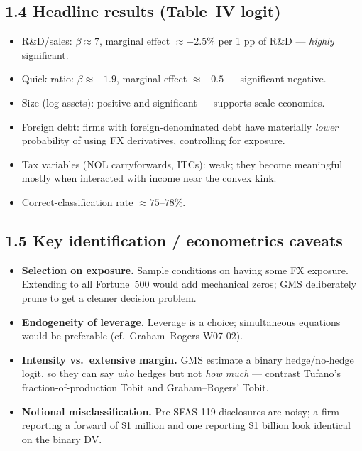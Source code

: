 \documentclass[11pt]{article}
\begin{document}
\subsection*{1.4 Headline results (Table~IV logit)}
\begin{itemize}
\item R\&D/sales: $\beta\approx 7$, marginal effect $\approx +2.5\%$ per 1 pp of R\&D --- \emph{highly} significant.
\item Quick ratio: $\beta\approx -1.9$, marginal effect $\approx -0.5$ --- significant negative.
\item Size (log assets): positive and significant --- supports scale economies.
\item Foreign debt: firms with foreign-denominated debt have materially \emph{lower} probability of using FX derivatives, controlling for exposure.
\item Tax variables (NOL carryforwards, ITCs): weak; they become meaningful mostly when interacted with income near the convex kink.
\item Correct-classification rate $\approx 75$--$78\%$.
\end{itemize}

\subsection*{1.5 Key identification / econometrics caveats}
\begin{alertbox}
\begin{itemize}
\item \textbf{Selection on exposure.} Sample conditions on having some FX exposure. Extending to all Fortune~500 would add mechanical zeros; GMS deliberately prune to get a cleaner decision problem.
\item \textbf{Endogeneity of leverage.} Leverage is a choice; simultaneous equations would be preferable (cf.\ Graham--Rogers W07-02).
\item \textbf{Intensity vs.\ extensive margin.} GMS estimate a binary hedge/no-hedge logit, so they can say \emph{who} hedges but not \emph{how much} --- contrast Tufano's fraction-of-production Tobit and Graham--Rogers' Tobit.
\item \textbf{Notional misclassification.} Pre-SFAS 119 disclosures are noisy; a firm reporting a forward of \$1 million and one reporting \$1 billion look identical on the binary DV.
\end{itemize}
\end{alertbox}
\end{document}
